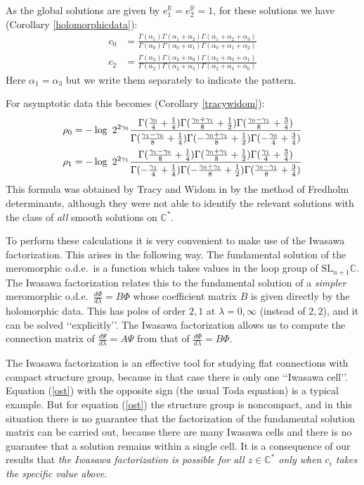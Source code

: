 \documentclass[a4paper,12pt,leqno]{amsart}
\numberwithin{equation}{section}
\theoremstyle{plain}
\theoremstyle{definition}
\newcommand{\C}{\mathbb C}
\newcommand{\R}{\mathbb R}
\newcommand{\al}{\alpha}
\newcommand{\ga}{\gamma}
\newcommand{\la}{\lambda}
\newcommand{\Ga}{\Gamma}
\newcommand{\SL}{\textrm{SL}}
\newcommand{\no}{\noindent}
\renewcommand{\ll}{\lq\lq}
\newcommand{\rrr}{\rq\rq}
\newcommand{\pga}{\vphantom{{A_A}_A}\ga}  %
\begin{document}
\no{\em Global solutions.}

As the global solutions are given by $e_1^\R=e_2^\R=1$,  for these solutions we have 
(Corollary \ref{holomorphicdata}):
\begin{align*}
c_0&=
\frac
{
\Ga( \al_1)
\Ga( \al_1\!+\!\al_2)
\Ga( \al_1\!+\!\al_2\!+\!\al_3)
}
{
\Ga( \al_0  )
\Ga( \al_0\!+\!\al_1)
\Ga( \al_0\!+\!\al_1\!+\!\al_2)
}
\\
c_2&=
\frac
{
\Ga(  \al_3  )
\Ga(  \al_3\!+\!\al_0)
\Ga(  \al_3\!+\!\al_0\!+\!\al_1)
}
{
\Ga(  \al_2)
\Ga(  \al_2\!+\!\al_3)
\Ga(  \al_2\!+\!\al_3\!+\!\al_0)
}
\end{align*}
Here $\al_1=\al_3$ but we write them separately to indicate the pattern.  

For asymptotic data this becomes
(Corollary \ref{tracywidom}):
\begin{align*}
\rho_0  &=  - \log\ 2^{2\ga_0}
\frac
{
\Ga(  \frac{\pga_0}{4}+\frac14  )
\Ga(  \frac{\pga_0+\pga_1}{8}+\frac12 )
\Ga(  \frac{\pga_0-\pga_1}{8}+\frac34  )
}
{
\Ga(  \frac{\pga_1-\pga_0}{8}+\frac14  )
\Ga(  -\frac{\pga_0+\pga_1}{8}+\frac12  )
\Ga(  -\frac{\pga_0}{4}+\frac34  )
}
\\
\rho_1 &=   - \log\ 2^{2\ga_1}
\frac
{
\Ga(  \frac{\pga_1-\pga_0}{8}+\frac14  )
\Ga(  \frac{\pga_0+\pga_1}{8}+\frac12 )
\Ga(  \frac{\pga_1}{4}+\frac34  )
}
{
\Ga(  -\frac{\pga_1}{4}+\frac14  )
\Ga(  -\frac{\pga_0+\pga_1}{8}+\frac12  )
\Ga(  \frac{\pga_0-\pga_1}{8}+\frac34  )
}
\end{align*}
This formula was obtained by Tracy and Widom in \cite{TrWi98} by the method of Fredholm determinants, although they were not able to identify the relevant solutions with the class of {\em all} smooth solutions on  $\C^\ast$.  

To perform these calculations it is very convenient to make use of the Iwasawa factorization. This arises in the following way. The fundamental solution of the meromorphic o.d.e.\ is a function which takes values in the loop group of $\SL_{n+1}\C$. The Iwasawa factorization relates this to the fundamental solution of a {\em simpler} meromorphic o.d.e.\ 
$\frac{d\Phi}{d\la}=B\Phi$ whose coefficient matrix $B$ is given directly by the holomorphic data. This has poles of order $2,1$ at $\la=0,\infty$ (instead of $2,2$),
and it can be solved \ll explicitly\rrr.  The  Iwasawa factorization 
allows us to compute the connection matrix of $\frac{d\Psi}{d\la}=A\Psi$ from that of $\frac{d\Phi}{d\la}=B\Phi$.

The Iwasawa factorization is an effective tool for studying flat connections with compact structure group, because in that case there is only one \ll Iwasawa cell\rrr.  Equation (\ref{ost}) with the opposite sign (the usual Toda equation) is a typical example.  But for equation (\ref{ost}) the structure group is noncompact, and 
in this situation there is no guarantee that the factorization of the fundamental solution matrix can be carried out, because there are many Iwasawa cells and there is no guarantee that a solution remains within a single cell.  
It is a consequence of our results that {\em the Iwasawa factorization is possible for all $z\in\C^\ast$ only when $c_i$ takes the specific value above.}
\end{document}
